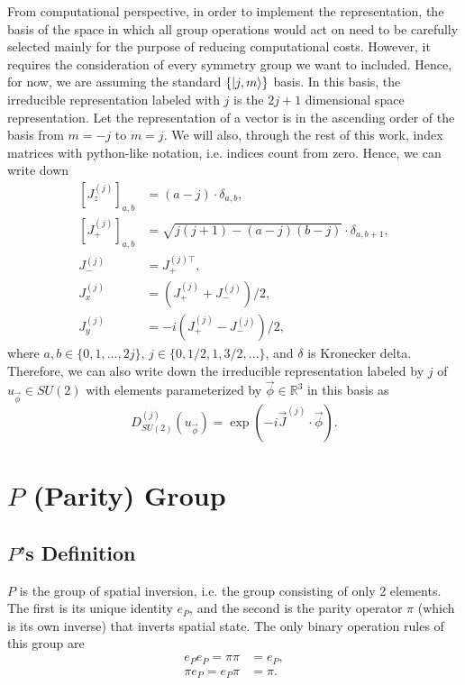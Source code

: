 \documentclass[preprint, 12pt]{revtex4-2}
\numberwithin{equation}{section}
\begin{document}
From computational perspective, in order to implement the representation, the basis of the space in which all group operations would act on need to be carefully selected mainly for the purpose of reducing computational costs. However, it requires the consideration of every symmetry group we want to included. Hence, for now, we are assuming the standard $\{\ket{j, m}\}$ basis. In this basis, the irreducible representation labeled with $j$ is the $2j+1$ dimensional space representation. Let the representation of a vector is in the ascending order of the basis from $m = -j$ to $m = j$. We will also, through the rest of this work, index matrices with python-like notation, i.e. indices count from zero. Hence, we can write down
\begin{equation}\label{eq:J's standard basis}
    \begin{aligned}
        \left[J_z^{(j)}\right]_{a,b} &= (a-j)\cdot\delta_{a, b}, \\
        \left[J_+^{(j)}\right]_{a,b} &= \sqrt{j(j+1)-(a-j)(b-j)}\cdot\delta_{a,b+1}, \\
        J_-^{(j)} &= J_+^{(j)\top}, \\
        J_x^{(j)} &= \left(J_+^{(j)}+J_-^{(j)}\right)/2, \\
        J_y^{(j)} &= -i\left(J_+^{(j)}-J_-^{(j)}\right)/2,
    \end{aligned}
\end{equation}
where $a, b\in \{0, 1, ..., 2j\}$, $j\in \{0, 1/2, 1, 3/2, ...\}$, and $\delta$ is Kronecker delta. Therefore, we can also write down the irreducible representation labeled by $j$ of $u_{\vec{\phi}}\in SU(2)$ with elements parameterized by $\vec{\phi}\in\mathbb{R}^3$ in this basis as
\begin{equation}\label{eq:SU2 Irreps}
    D^{(j)}_{SU(2)}(u_{\vec{\phi}}) = \exp(-i\vec{J}^{(j)}\cdot\vec{\phi}).
\end{equation}

\newpage
\section{$P$ (Parity) Group}

\subsection{$P$'s Definition}
$P$ is the group of spatial inversion, i.e. the group consisting of only 2 elements. The first is its unique identity $e_P$, and the second is the parity operator $\pi$ (which is its own inverse) that inverts spatial state. The only binary operation rules of this group are
\begin{equation}\label{eq:P binary operations}
    \begin{aligned}
        e_Pe_P = \pi\pi &= e_P, \\
        \pi e_P = e_P \pi &= \pi.
    \end{aligned}
\end{equation}
\end{document}

